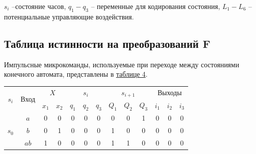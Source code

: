 \documentclass[10pt,a4paper,final]{article} %
\begin{document}
$s_i$ --состояние часов, $q_1 - q_3$ -- переменные для кодирования состояния, $L_1 - L_6$ -- потенциальные управляющие воздействия.


\subsection{Таблица истинности на преобразований F}
Импульсные микрокоманды, используемые при переходе между состояниями конечного автомата, представлены в \hyperref[F]{таблице 4}.

\begin{table}[h!]
	\centering

		\begin{tabular}{|c|c|cc|ccc|ccc|ccc|}
			\hline
			\multirow{2}{*}{$s_i$} & \multirow{2}{*}{Вход} & \multicolumn{2}{c|}{$X$} & \multicolumn{3}{c|}{$s_i$} & \multicolumn{3}{c|}{$s_{i+1}$} & \multicolumn{3}{c|}{Выходы} \\ 
			\cline{3-13}
			& 
			& $x_1$ & $x_2$                
			& {$q_1$} & $q_2$ & $q_3$                
			& {$Q_1$} & $Q_2$ & $Q_3$                  
			& $i_1$ & $i_2$ & $i_3$                  \\ 
			\hline

			
			\multirow{3}{*}{$s_0$} & $a$ & 0 &	0 &	0 &	0 &	0 &	0 &	0 &	1 &	0 &	0 &	0 \\
			& $b$ & 0 &	1 &	0 &	0 &	0 &	1 &	0 &	0 &	0 &	0 &	0 \\
			& $ab$ & 1 &	0 &	0 &	0 &	0 &	1 &	1 &	0 &	0 &	0 &	0 \\
			\hline
			

\end{tabular}
\end{table}
\end{document}
